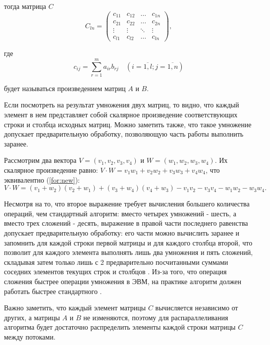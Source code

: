 \documentclass[12pt]{report}
\begin{document}
тогда матрица $C$
\begin{equation}
	C_{ln} = \begin{pmatrix}
		c_{11} & c_{12} & \ldots & c_{1n}\\
		c_{21} & c_{22} & \ldots & c_{2n}\\
		\vdots & \vdots & \ddots & \vdots\\
		c_{l1} & c_{l2} & \ldots & c_{ln}
	\end{pmatrix},
\end{equation}

где
\begin{equation}
	\label{anal:eq}
	c_{ij} =
	\sum_{r=1}^{m} a_{ir}b_{rj} \quad (i=\overline{1,l}; j=\overline{1,n})
\end{equation}

будет называться произведением матриц $A$ и $B$.

Если посмотреть на результат умножения двух матриц, то видно, что каждый элемент в нем представляет собой скалярное произведение соответствующих строки и столбца исходных матриц.
Можно заметить также, что такое умножение допускает предварительную обработку, позволяющую часть работы выполнить заранее.

Рассмотрим два вектора $V = (v_1, v_2, v_3, v_4)$ и $W = (w_1, w_2, w_3, w_4)$.
Их скалярное произведение равно: $V \cdot W = v_1w_1 + v_2w_2 + v_3w_3 + v_4w_4$, что эквивалентно (\ref{for:new}):
\begin{equation}
    \label{for:new}
    V \cdot W = (v_1 + w_2)(v_2 + w_1) + (v_3 + w_4)(v_4 + w_3) - v_1v_2 - v_3v_4 - w_1w_2 - w_3w_4.
\end{equation}

Несмотря на то, что второе выражение требует вычисления большего количества операций, чем стандартный алгоритм: вместо четырех умножений - шесть, а вместо трех сложений - десять, выражение в правой части последнего равенства допускает предварительную обработку: его части можно вычислить заранее и запомнить для каждой строки первой матрицы и для каждого столбца второй, что позволит для каждого элемента выполнять лишь два умножения и пять сложений, складывая затем только лишь с 2 предварительно посчитанными суммами соседних элементов текущих строк и столбцов \cite{CoppersmithAndWinograd}.
Из-за того, что операция сложения быстрее операции умножения в ЭВМ, на практике алгоритм должен работать быстрее стандартного \cite{PogorelovVolkova}.

Важно заметить, что каждый элемент матрицы $C$ вычисляется независимо от других, а матрицы $A$ и $B$ не изменяются, поэтому для распараллеливания алгоритма будет достаточно распределить элементы каждой строки матрицы $C$ между потоками.
\end{document}
